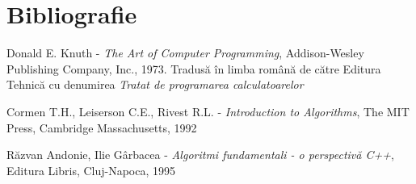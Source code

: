 \chapter{Bibliografie}

\item Donald E. Knuth - {\it The Art of Computer Programming}, Addison-Wesley Publishing Company, Inc., 1973. Tradusă în limba română de către Editura Tehnică cu denumirea {\it Tratat de programarea calculatoarelor}
\item Cormen T.H., Leiserson C.E., Rivest R.L. - {\it Introduction to Algorithms}, The MIT Press, Cambridge Massachusetts, 1992
\item Răzvan Andonie, Ilie Gârbacea - {\it Algoritmi fundamentali - o perspectivă C++}, Editura Libris, Cluj-Napoca, 1995
